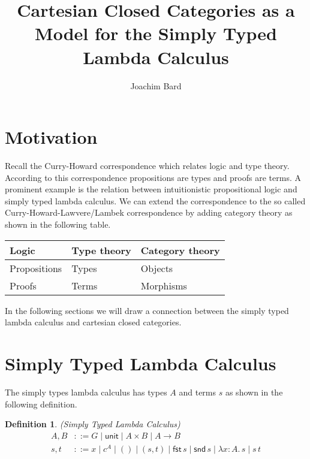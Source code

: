 \documentclass{article}
\title{Cartesian Closed Categories as a Model for the Simply Typed Lambda Calculus}
\author{Joachim Bard}
\newtheorem{defn}{Definition}[section]
\newcommand{\unit}{\mathsf{unit}}
\newcommand{\fst}{\mathsf{fst}\,}
\newcommand{\snd}{\mathsf{snd}\,}
\begin{document}
\maketitle

\section{Motivation}
\label{sec:motiv}

Recall the Curry-Howard correspondence which relates logic and type theory.
According to this correspondence propositions are types and proofs are terms.
A prominent example is the relation between intuitionistic propositional logic and simply typed lambda calculus.
We can extend the correspondence to the so called Curry-Howard-Lawvere/Lambek correspondence by adding category theory as shown in the following table.

\begin{center}
    \begin{tabular}{l|l|l}
        Logic & Type theory & Category theory\\
        \hline
        Propositions & Types & Objects\\
        Proofs & Terms & Morphisms
    \end{tabular}
\end{center}

In the following sections we will draw a connection between the simply typed lambda calculus and cartesian closed categories.


\section{Simply Typed Lambda Calculus}

The simply types lambda calculus has types $A$ and terms $s$ as shown in the following definition.

\begin{defn}{(Simply Typed Lambda Calculus)}
    \label{def:stlc}
    \begin{align*}
        A, B & ::= G \mid \unit \mid A \times B \mid A \to B \\
        s, t & ::= x \mid c^A \mid () \mid (s, t) \mid \fst s \mid \snd s \mid \lambda x: A.\, s \mid s\, t
    \end{align*}
\end{defn}
\end{document}
